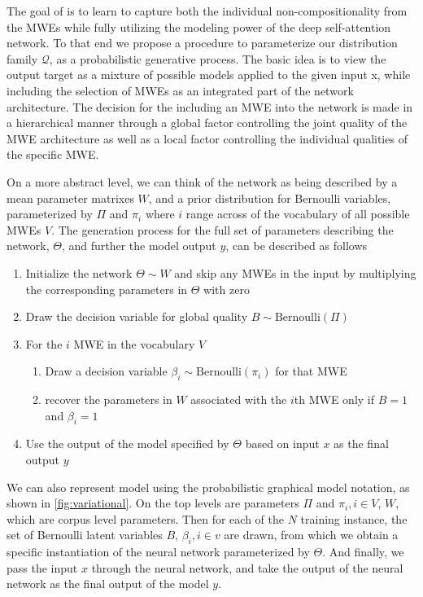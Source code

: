 The goal of \BertMWE is to learn to capture both the individual non-compositionality from the MWEs while fully utilizing the modeling power of the deep self-attention network. 
To that end we propose a procedure to parameterize our distribution family $\mathcal{Q}$, 
as a probabilistic generative process. 
The basic idea is to view the output target as a mixture of possible models applied to the given input x, 
while including the selection of MWEs as an integrated part of the network architecture.
The decision for the including an MWE into the network is made in a hierarchical manner through a global factor controlling the joint quality of the MWE architecture as well as a local factor controlling the individual qualities of the specific MWE.

On a more abstract level, we can think of the network as being described by a mean parameter matrixes $W$, and a prior distribution for Bernoulli variables, parameterized by $\Pi$ and $\pi_i$ where $i$ range across of the vocabulary of all possible MWEs $V$. The generation process for the full set of parameters describing the network, $\Theta$, and further the model output $y$, can be described as follows
\begin{enumerate}
    \item Initialize the network $\Theta \sim W$  and skip any MWEs in the input by multiplying the corresponding parameters in $\Theta$ with zero
    \item Draw the decision variable for global quality
        $B \sim \mbox{Bernoulli}(\Pi)$
    \item{For the $i$ MWE in the vocabulary $V$}
    \begin{enumerate}
        \item Draw a decision variable $\beta_i \sim \mbox{Bernoulli}(\pi_i)$ for that MWE 
        \item{recover the parameters in $W$ associated with the $i$th MWE only if $B=1$ and $\beta_{i}=1$}
    \end{enumerate}
    \item{Use the output of the model specified by $\Theta$ based on input $x$ as the final output $y$ }
\end{enumerate}


We can also represent \BertMWE model using the probabilistic graphical model notation, as shown in \autoref{fig:variational}. 
On the top levels are parameters $\Pi$ and $\pi_i, i \in V$, $W$, which are corpus level parameters. Then for each of the $N$ training instance, the set of Bernoulli latent variables
$B$, $\beta_i, i\in v$ are drawn, from which we obtain a specific instantiation of the neural network parameterized by $\Theta$. And finally, we pass the input $x$ through the neural network, and take the output of the neural network as the final output of the model $y$.

